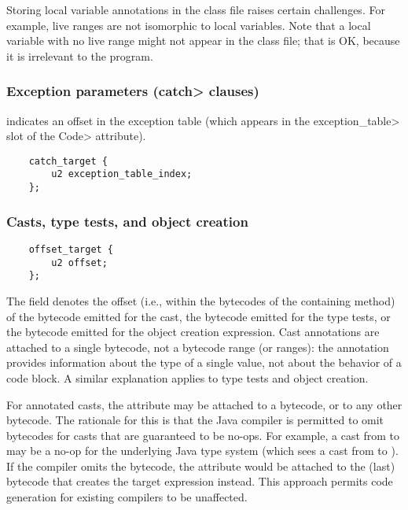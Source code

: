 \documentclass[10pt]{article}
\begin{document}
Storing local variable annotations in the class file raises certain
challenges.  For example, live ranges are not isomorphic to local
variables.  Note that a local variable with no live range might not appear in
the class file; that is OK, because it is irrelevant to the program.



\subsubsection{Exception parameters (\<catch> clauses)\label{class-file:ext:ri:catch}}

 indicates an offset in the exception table (which
appears in the \<exception\_table> slot of the \<Code> attribute).

\preverbnegspace
\begin{Verbatim}
    catch_target {
        u2 exception_table_index;
    };
\end{Verbatim}



\subsubsection{Casts, type tests, and object creation\label{class-file:ext:ri:cast}}


\preverbnegspace
\begin{Verbatim}
    offset_target {
        u2 offset;
    };
\end{Verbatim}

The  field denotes the offset (i.e., within the bytecodes
of the containing method) of the  bytecode emitted for
the cast, the  bytecode emitted for the type tests,
or the  bytecode emitted for the object creation expression.
Cast annotations are attached to a single bytecode, not a bytecode range
(or ranges):  the annotation provides information about the type of a
single value, not about the behavior of a code block.
A similar explanation applies to type tests and object creation.

For annotated casts, the attribute may be attached to a
 bytecode, or to any other bytecode.  The rationale for
this is that the Java compiler is permitted to omit 
bytecodes for casts that are guaranteed to be no-ops.  For example, a
cast from  to  may be a no-op for the
underlying Java type system (which sees a cast from  to
).  If the compiler omits the  bytecode, the
 attribute would be attached to the (last) bytecode that
creates the target expression instead.  This approach permits code
generation for existing compilers to be unaffected.
\end{document}
